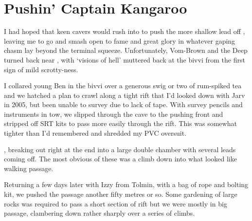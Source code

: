 

\section{Pushin' Captain Kangaroo}


I had hoped that keen cavers would rush into  to push
the more shallow lead off , leaving me to go and smash
open  to fame and great glory in whatever gaping chasm lay
beyond the terminal squeeze. Unfortunately, Vom-Brown and the Deep
turned back near , with `visions of hell' muttered back at
the bivvi from the first sign of mild scrotty-ness.

I collared young Ben in the bivvi over a generous swig or two of
rum-spiked tea and we hatched a plan to crawl along a tight rift that
I'd looked down with Jarv in 2005, but been unable to survey due to lack
of tape. With survey pencils and instruments in tow, we slipped through
the cave to the pushing front and stripped off SRT kits to pass more
easily through the rift. This was somewhat tighter than I'd remembered
and shredded my PVC oversuit.

, breaking out right at the end into a
large double chamber with several leads coming off. The most obvious of
these was a climb down into what looked like walking passage.

Returning a few days later with Izzy from Tolmin, with a bag of rope and
bolting kit, we pushed the passage another fifty metres or so. Some
gardening of large rocks was required to pass a short section of rift
but we were mostly in big passage, clambering down rather sharply over a
series of climbs.

